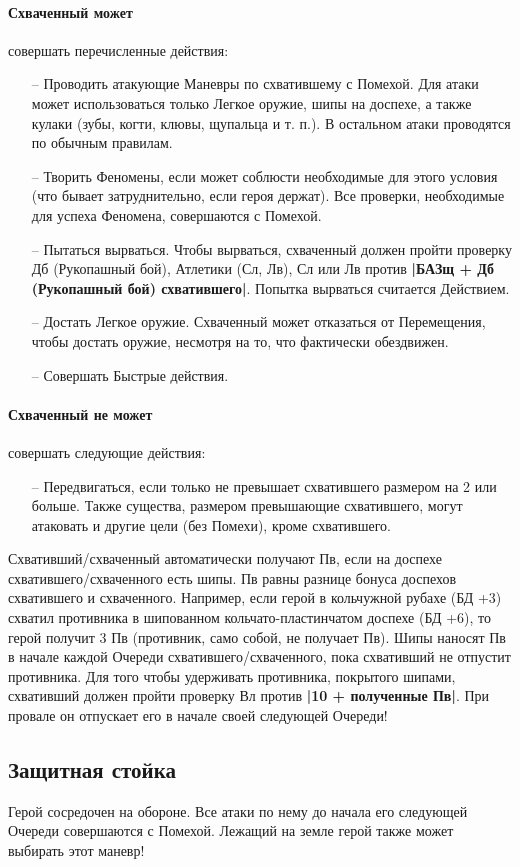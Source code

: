 \paragraph{Схваченный может} совершать перечисленные действия:
\begin{itemize}
\item[--] Проводить атакующие Маневры по схватившему с Помехой. Для атаки может использоваться только Легкое оружие, шипы на доспехе, а также кулаки (зубы, когти, клювы, щупальца и т. п.). В остальном атаки проводятся по обычным правилам.
\item[--] Творить Феномены, если может соблюсти необходимые для этого условия (что бывает затруднительно, если героя держат). Все проверки, необходимые для успеха Феномена, совершаются с Помехой.
\item[--] Пытаться вырваться. Чтобы вырваться, схваченный должен пройти проверку Дб (Рукопашный бой), Атлетики (Сл, Лв), Сл или Лв против \textbf{|БАЗщ + Дб (Рукопашный бой) схватившего|}. Попытка вырваться считается Действием.
\item[--] Достать Легкое оружие. Схваченный может отказаться от Перемещения, чтобы достать оружие, несмотря на то, что фактически обездвижен.
\item[--] Совершать Быстрые действия.
\end{itemize}
\paragraph{Схваченный не может} совершать следующие действия:
\begin{itemize}
\item[--] Передвигаться, если только не превышает схватившего размером на 2 или больше. Также существа, размером превышающие схватившего, могут атаковать и другие цели (без Помехи), кроме схватившего. 
\end{itemize}
Схвативший/схваченный автоматически получают Пв, если на доспехе схватившего/схваченного есть шипы. Пв равны разнице бонуса доспехов схватившего и схваченного. Например, если герой в кольчужной рубахе (БД +3) схватил противника в шипованном кольчато-пластинчатом доспехе (БД +6), то герой получит 3 Пв (противник, само собой, не получает Пв). Шипы наносят Пв в начале каждой Очереди схватившего/схваченного, пока схвативший не отпустит противника. Для того чтобы удерживать противника, покрытого шипами, схвативший должен пройти проверку Вл против \textbf{|10 + полученные Пв|}. При провале он отпускает его в начале своей следующей Очереди!
\subsection{Защитная стойка}
Герой сосредочен на обороне. Все атаки по нему до начала его следующей Очереди совершаются с Помехой. Лежащий на земле герой также может выбирать этот маневр!
